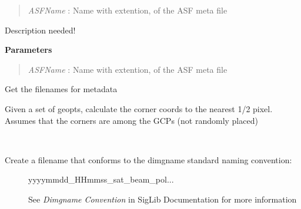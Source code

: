 \documentclass[letterpaper,10pt,openany,oneside]{sphinxmanual}
\begin{document}
\begin{fulllineitems}
\begin{fulllineitems}
\begin{quote}
\emph{ASFName} : Name with extention, of the ASF meta file
\end{quote}

\end{fulllineitems}


\begin{fulllineitems}
\label{code:Metadata.Metadata.getASFProductType}
Description needed!

\textbf{Parameters}
\begin{quote}

\emph{ASFName} : Name with extention, of the ASF meta file
\end{quote}

\end{fulllineitems}


\begin{fulllineitems}
\label{code:Metadata.Metadata.getCEOSmetafile}
Get the filenames for metadata

\end{fulllineitems}


\begin{fulllineitems}
\label{code:Metadata.Metadata.getCornerPoints}
Given a set of geopts, calculate the corner coords to the nearest 1/2
pixel. Assumes that the corners are among the GCPs (not randomly placed)

\end{fulllineitems}


\begin{fulllineitems}
\label{code:Metadata.Metadata.getDimgname}~\begin{description}
\item[{Create a filename that conforms to the dimgname standard naming convention:}] \leavevmode
yyyymmdd\_HHmmss\_sat\_beam\_pol...

See \emph{Dimgname Convention} in SigLib Documentation for more information


\end{description}
\end{fulllineitems}
\end{fulllineitems}
\end{document}
